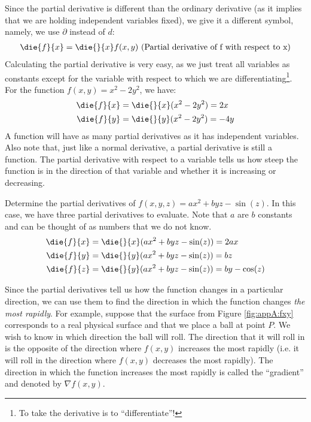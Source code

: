  Since the partial derivative is different than the ordinary derivative (as it implies that we are holding independent variables fixed), we give it a different symbol, namely, we use $\partial$ instead of $d$:
\begin{align*}
\die{f}{x}=\die{}{x}f(x,y)\text{ (Partial derivative of f with respect to x)}
\end{align*}
Calculating the partial derivative is very easy, as we just treat all variables as constants except for the variable with respect to which we are differentiating\footnote{To take the derivative is to ``differentiate''!}. For the function $f(x,y)=x^2-2y^2$, we have:
\begin{align*}
\die{f}{x}&=\die{}{x}(x^2-2y^2) = 2x\\
\die{f}{y}&=\die{}{y}(x^2-2y^2) = -4y
\end{align*}
A function will have as many partial derivatives as it has independent variables. Also note that, just like a normal derivative, a partial derivative is still a function. The partial derivative with respect to a variable tells us how steep the function is in the direction of that variable and whether it is increasing or decreasing.

\begin{example}{Determine the partial derivatives of $f(x,y,z)=ax^2+byz-\sin(z)$.}
In this case, we have three partial derivatives to evaluate. Note that $a$ are $b$ constants and can be thought of as numbers that we do not know.
\label{ex:appA:partials}
\begin{align*}
\die{f}{x}&=\die{}{x}(ax^2+byz-\sin(z)) = 2ax\\
\die{f}{y}&=\die{}{y}(ax^2+byz-\sin(z)) = bz \\
\die{f}{z}&=\die{}{y}(ax^2+byz-\sin(z)) = by-\cos(z) 
\end{align*} 
\end{example}

Since the partial derivatives tell us how the function changes in a particular direction, we can use them to find the direction in which the function changes \textit{the most rapidly}. For example, suppose that the surface from Figure \ref{fig:appA:fxy} corresponds to a real physical surface and that we place a ball at point $P$. We wish to know in which direction the ball will roll. The direction that it will roll in is the opposite of the direction where $f(x,y)$ increases the most rapidly (i.e. it will roll in the direction where $f(x,y)$ decreases the most rapidly). The direction in which the function increases the most rapidly is called the ``gradient'' and denoted by $\nabla f(x,y)$.

